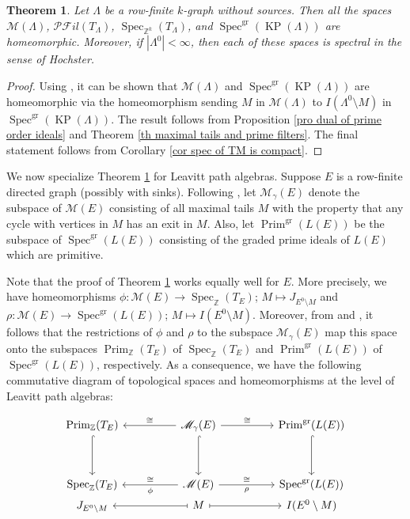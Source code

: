 \documentclass[a4paper,reqno,12pt]{amsart}
\numberwithin{equation}{section}
\newtheorem{thm}{Theorem}[section]
\theoremstyle{definition}
\theoremstyle{remark}
\newcommand{\Prim}{\operatorname{Prim}}
\newcommand{\Spec}{\operatorname{Spec}}
\newcommand{\gr}{\operatorname{gr}}
\newcommand{\KP}{\operatorname{KP}}
\begin{document}
\begin{thm}\label{th the three term connection for KPA}
Let $\Lambda$ be a row-finite $k$-graph without sources. Then all the spaces $\mathscr{M}(\Lambda)$, $\mathscr{P}\mathscr{F}il(T_\Lambda)$, $\Spec_{\mathbb{Z}^k}(T_\Lambda)$, and $\Spec^{\gr}(\KP(\Lambda))$ are homeomorphic. Moreover, if $|\Lambda^0|<\infty$, then each of these spaces is spectral in the sense of Hochster.
\end{thm}
\begin{proof}
Using \cite[Proposition 4.1]{Larki}, it can be shown that $\mathscr{M}(\Lambda)$ and $\Spec^{\gr}(\KP(\Lambda))$ are homeomorphic via the homeomorphism sending $M$ in $\mathscr{M}(\Lambda)$ to $I(\Lambda^0\setminus M)$ in $\Spec^{\gr}(\KP(\Lambda))$. The result follows from Proposition \ref{pro dual of prime order ideals} and Theorem \ref{th maximal tails and prime filters}. The final statement follows from Corollary \ref{cor spec of TM is compact}.
\end{proof}

We now specialize Theorem \ref{th the three term connection for KPA} for Leavitt path algebras. Suppose $E$ is a row-finite directed graph (possibly with sinks). Following \cite[Definition 4.1.6]{lpabook}, let $\mathscr{M}_\gamma(E)$ denote the subspace of $\mathscr{M}(E)$ consisting of all maximal tails $M$ with the property that any cycle with vertices in $M$ has an exit in $M$. Also, let $\Prim^{\gr}(L(E))$ be the subspace of $\Spec^{\gr}(L(E))$ consisting of the graded prime ideals of $L(E)$ which are primitive. 

Note that the proof of Theorem \ref{th the three term connection for KPA} works equally well for $E$. More precisely, we have homeomorphisms $\phi:\mathscr{M}(E)\longrightarrow \Spec_\mathbb{Z}(T_E)$; $M\longmapsto J_{E^0\setminus M}$ and $\rho:\mathscr{M}(E)\longrightarrow \Spec^{\gr}(L(E))$; $M\longmapsto I(E^0\setminus M)$. Moreover, from \cite[Lemma 2.2 \& Corollary 4.3(i)]{hazli} and \cite[Theorem 4.1.11]{lpabook}, it follows that the restrictions of $\phi$ and $\rho$ to the subspace $\mathscr{M}_\gamma(E)$ map this space onto the subspaces $\Prim_{\mathbb{Z}}(T_E)$ of $\Spec_{\mathbb{Z}}(T_E)$ and $\Prim^{\operatorname{gr}}(L(E))$ of $\Spec^{\operatorname{gr}}(L(E))$, respectively. As a consequence, we have the following commutative diagram of topological spaces and homeomorphisms at the level of Leavitt path algebras: 

\[
\begin{tikzcd}[row sep=huge, column sep=huge]
\Prim_{\mathbb{Z}}(T_E) \arrow[d, hook] & 
\mathscr{M}_{\gamma}(E) \arrow[l, "\cong"'] \arrow[r, "\cong"] \arrow[d, hook] & 
\Prim^{\operatorname{gr}}(L(E)) \arrow[d, hook] \\
%
\Spec_{\mathbb{Z}}(T_E) & 
\mathscr{M}(E) \arrow[l, "\cong"', "\phi"] \arrow[r, "\cong", "\rho"'] & 
\Spec^{\operatorname{gr}}(L(E)) \\[-3.5em]
%
J_{E^0 \setminus M} & 
M \arrow[l, maps to] \arrow[r, maps to] & 
I(E^0 \setminus M)
\end{tikzcd}
\]
\end{document}
